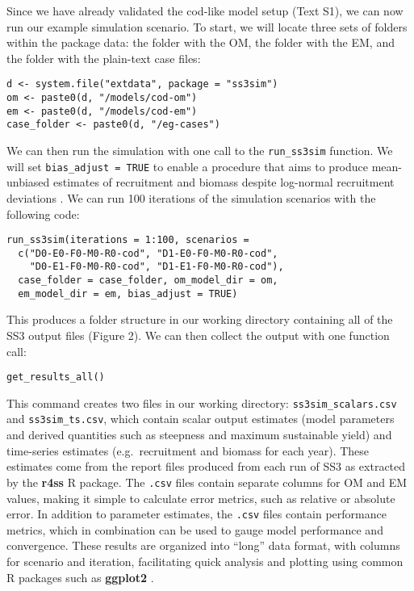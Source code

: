 \documentclass[10pt]{article}
\newcommand{\R}[1]{\label{#1}\linelabel{#1}}
\begin{document}
Since we have already validated the cod-like model setup (Text S1), we can now
run our example simulation scenario. To start, we will locate three sets of
folders within the package data: the folder with the OM, the folder with the
EM, and the folder with the plain-text case files:

\begin{verbatim}
d <- system.file("extdata", package = "ss3sim")
om <- paste0(d, "/models/cod-om")
em <- paste0(d, "/models/cod-em")
case_folder <- paste0(d, "/eg-cases")
\end{verbatim}

We can then run the simulation with one call to the \texttt{run\_ss3sim}
function. We will set \texttt{bias\_adjust = TRUE} to enable a procedure that
aims to produce mean-unbiased estimates of recruitment and biomass despite
log-normal recruitment deviations \cite{methot2011}. We can run 100 iterations
of the simulation scenarios with the following code:

\begin{verbatim}
run_ss3sim(iterations = 1:100, scenarios =
  c("D0-E0-F0-M0-R0-cod", "D1-E0-F0-M0-R0-cod",
    "D0-E1-F0-M0-R0-cod", "D1-E1-F0-M0-R0-cod"),
  case_folder = case_folder, om_model_dir = om,
  em_model_dir = em, bias_adjust = TRUE)
\end{verbatim}

\noindent
This produces a folder structure in our working directory containing all of the
SS3 output files \R{B21:3}(Figure 2). We can then collect the output with one
function call:

\begin{verbatim}
get_results_all()
\end{verbatim}

\noindent
This command creates two files in our working directory:
\texttt{ss3sim\_scalars.csv} and \texttt{ss3sim\_ts.csv}, which contain scalar
output estimates \R{B22}(model parameters and derived quantities such as
steepness and maximum sustainable yield) and time-series estimates
(e.g.~recruitment and biomass for each year). These estimates come from the
report files produced from each run of SS3 as extracted by the \textbf{r4ss}
\textsf{R} package. The \texttt{.csv} files contain separate columns for OM and
EM values, making it simple to calculate error metrics, such as relative or
absolute error. In addition to parameter estimates, the \texttt{.csv} files
contain performance metrics, which in combination can be used to gauge model
performance and convergence. These results are organized into ``long'' data
format, with columns for scenario and iteration, facilitating quick analysis
and plotting using common \textsf{R} packages such as \textbf{ggplot2}
\cite{wickham2009}.
\end{document}
